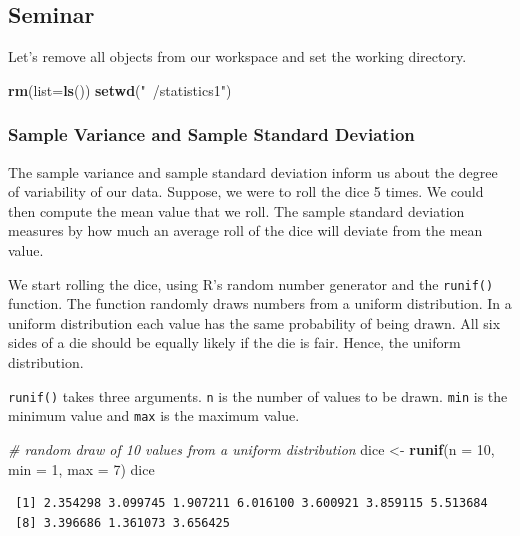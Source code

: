 \documentclass[]{article}
\newenvironment{Shaded}{\begin{snugshade}}{\end{snugshade}}
\newcommand{\KeywordTok}[1]{\textcolor[rgb]{0.13,0.29,0.53}{\textbf{#1}}}
\newcommand{\DataTypeTok}[1]{\textcolor[rgb]{0.13,0.29,0.53}{#1}}
\newcommand{\DecValTok}[1]{\textcolor[rgb]{0.00,0.00,0.81}{#1}}
\newcommand{\StringTok}[1]{\textcolor[rgb]{0.31,0.60,0.02}{#1}}
\newcommand{\CommentTok}[1]{\textcolor[rgb]{0.56,0.35,0.01}{\textit{#1}}}
\newcommand{\NormalTok}[1]{#1}
\theoremstyle{definition}
\theoremstyle{definition}
\theoremstyle{definition}
\theoremstyle{remark}
\begin{document}
\subsection{Seminar}\label{seminar-4}

Let's remove all objects from our workspace and set the working
directory.

\begin{Shaded}
\begin{Highlighting}[]
\KeywordTok{rm}\NormalTok{(}\DataTypeTok{list=}\KeywordTok{ls}\NormalTok{())}
\KeywordTok{setwd}\NormalTok{(}\StringTok{"~/statistics1"}\NormalTok{)}
\end{Highlighting}
\end{Shaded}

\subsubsection{Sample Variance and Sample Standard
Deviation}\label{sample-variance-and-sample-standard-deviation}

The sample variance and sample standard deviation inform us about the
degree of variability of our data. Suppose, we were to roll the dice 5
times. We could then compute the mean value that we roll. The sample
standard deviation measures by how much an average roll of the dice will
deviate from the mean value.

We start rolling the dice, using R's random number generator and the
\texttt{runif()} function. The function randomly draws numbers from a
uniform distribution. In a uniform distribution each value has the same
probability of being drawn. All six sides of a die should be equally
likely if the die is fair. Hence, the uniform distribution.

\texttt{runif()} takes three arguments. \texttt{n} is the number of
values to be drawn. \texttt{min} is the minimum value and \texttt{max}
is the maximum value.

\begin{Shaded}
\begin{Highlighting}[]
\CommentTok{# random draw of 10 values from a uniform distribution}
\NormalTok{dice <-}\StringTok{ }\KeywordTok{runif}\NormalTok{(}\DataTypeTok{n =} \DecValTok{10}\NormalTok{, }\DataTypeTok{min =} \DecValTok{1}\NormalTok{, }\DataTypeTok{max =} \DecValTok{7}\NormalTok{)}
\NormalTok{dice}
\end{Highlighting}
\end{Shaded}

\begin{verbatim}
 [1] 2.354298 3.099745 1.907211 6.016100 3.600921 3.859115 5.513684
 [8] 3.396686 1.361073 3.656425
\end{verbatim}
\end{document}
